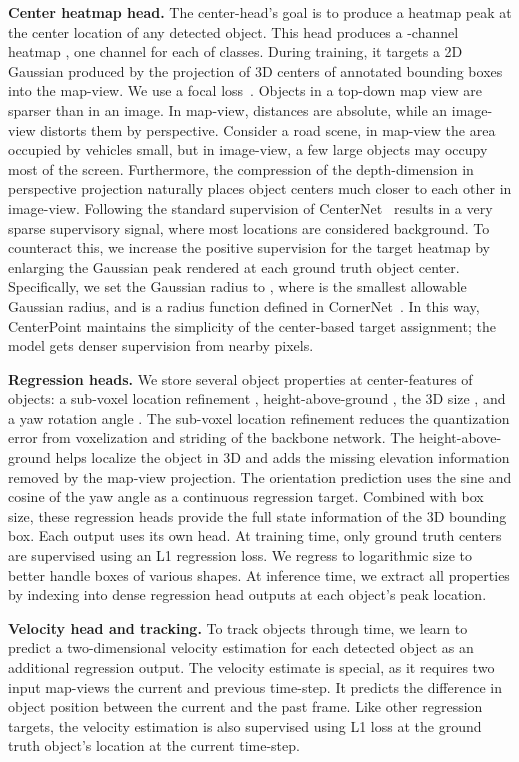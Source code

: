 \documentclass[final]{cvpr}
\begin{document}
\noindent 
\textbf{Center heatmap head.}
The center-head's goal is to produce a heatmap peak at the center location of any detected object.
This head produces a -channel heatmap , one channel for each of  classes.
During training, it targets a 2D Gaussian produced by the projection of 3D centers of annotated bounding boxes into the map-view. 
We use a focal loss~\cite{cornernet, zhou2019objects}.
Objects in a top-down map view are sparser than in an image.
In map-view, distances are absolute, while an image-view distorts them by perspective.
Consider a road scene, in map-view the area occupied by vehicles small, but in image-view, a few large objects may occupy most of the screen.
Furthermore, the compression of the depth-dimension in perspective projection naturally places object centers much closer to each other in image-view.
Following the standard supervision of CenterNet~\cite{zhou2019objects} results in a very sparse supervisory signal, where most locations are considered background.
To counteract this, we increase the positive supervision for the target heatmap  by enlarging the Gaussian peak rendered at each ground truth object center.
Specifically, we set the Gaussian radius to , where  is the smallest allowable Gaussian radius, and  is a radius function defined in CornerNet~\cite{cornernet}.
In this way, CenterPoint maintains the simplicity of the center-based target assignment; the model gets denser supervision from nearby pixels.

\noindent 
\textbf{Regression heads.}
We store several object properties at center-features of objects: a sub-voxel location refinement , height-above-ground , the 3D size , and a yaw rotation angle .
The sub-voxel location refinement  reduces the quantization error from voxelization and striding of the backbone network.
The height-above-ground  helps localize the object in 3D and adds the missing elevation information removed by the map-view projection.
The orientation prediction uses the sine and cosine of the yaw angle as a continuous regression target.
Combined with box size, these regression heads provide the full state information of the 3D bounding box.
Each output uses its own head.
At training time, only ground truth centers are supervised using an L1 regression loss.
We regress to logarithmic size to better handle boxes of various shapes.
At inference time, we extract all properties by indexing into dense regression head outputs at each object's peak location.

\noindent 
\textbf{Velocity head and tracking.}
To track objects through time, we learn to predict a two-dimensional velocity estimation  for each detected object as an additional regression output.
The velocity estimate is special, as it requires two input map-views the current and previous time-step.
It predicts the difference in object position between the current and the past frame.
Like other regression targets, the velocity estimation is also supervised using L1 loss at the ground truth object's location at the current time-step.
\end{document}

